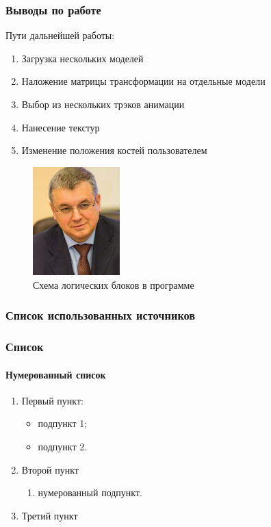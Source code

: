 \documentclass{beamer}
\begin{document}
\begin{frame}
\frametitle{Выводы по работе}
    Пути дальнейшей работы:
\begin{enumerate} 
	\item Загрузка нескольких моделей
	\item Наложение матрицы трансформации на отдельные модели
	\item Выбор из нескольких трэков анимации
	\item Нанесение текстур
	\item Изменение положения костей пользователем
\end{enumerate}

\begin{figure}[h!]
    \centering
    \includegraphics[width=0.3\textwidth]{kouzminov.png}
    \caption{\scriptsize{Схема логических блоков в программе}}
\end{figure}

\end{frame}




\begin{frame}
\frametitle{Список использованных источников}
    
    
\end{frame}













\begin{frame}
\frametitle{Список}
\framesubtitle{Нумерованный список}
	\begin{enumerate} 
		\item Первый пункт:
		\begin{itemize}
			\item подпункт 1;
			\item подпункт 2.
		\end{itemize}
		\item Второй пункт
		\begin{enumerate}
			\item нумерованный подпункт.
		\end{enumerate} 
		\item Третий пункт
	\end{enumerate} 
\end{frame}
\end{document}
